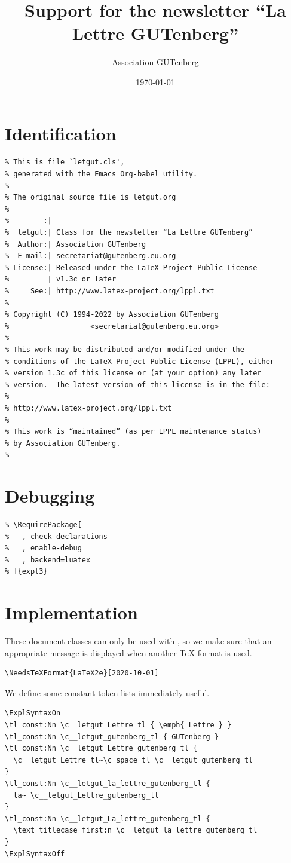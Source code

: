 \documentclass{letgut}
\author{Association GUTenberg}
\date{\today}
\title{Support for the newsletter “La Lettre GUTenberg”}
\begin{document}
\section{Identification}
\label{sec:org4c9ba67}

\begin{lstlisting}
% This is file `letgut.cls',
% generated with the Emacs Org-babel utility.
%
% The original source file is letgut.org
%
% -------:| ----------------------------------------------------
%  letgut:| Class for the newsletter “La Lettre GUTenberg”
%  Author:| Association GUTenberg
%  E-mail:| secretariat@gutenberg.eu.org
% License:| Released under the LaTeX Project Public License
%         | v1.3c or later
%     See:| http://www.latex-project.org/lppl.txt
%
% Copyright (C) 1994-2022 by Association GUTenberg
%                   <secretariat@gutenberg.eu.org>
%
% This work may be distributed and/or modified under the
% conditions of the LaTeX Project Public License (LPPL), either
% version 1.3c of this license or (at your option) any later
% version.  The latest version of this license is in the file:
%
% http://www.latex-project.org/lppl.txt
%
% This work is “maintained” (as per LPPL maintenance status)
% by Association GUTenberg.
%
\end{lstlisting}

\section{Debugging}
\label{sec:org09b0cd2}

\begin{lstlisting}
% \RequirePackage[
%   , check-declarations
%   , enable-debug
%   , backend=luatex
% ]{expl3}
\end{lstlisting}

\section{Implementation}
\label{sec:org59fbe1b}

These document classes can only be used with \LaTeXe, so we make
sure that an appropriate message is displayed when another \TeX{}
format is used.

\begin{lstlisting}
\NeedsTeXFormat{LaTeX2e}[2020-10-01]
\end{lstlisting}

We define some constant token lists immediately useful.

\begin{lstlisting}
\ExplSyntaxOn
\tl_const:Nn \c__letgut_Lettre_tl { \emph{ Lettre } }
\tl_const:Nn \c__letgut_gutenberg_tl { GUTenberg }
\tl_const:Nn \c__letgut_Lettre_gutenberg_tl {
  \c__letgut_Lettre_tl~\c_space_tl \c__letgut_gutenberg_tl
}
\tl_const:Nn \c__letgut_la_lettre_gutenberg_tl {
  la~ \c__letgut_Lettre_gutenberg_tl
}
\tl_const:Nn \c__letgut_La_lettre_gutenberg_tl {
  \text_titlecase_first:n \c__letgut_la_lettre_gutenberg_tl
}
\ExplSyntaxOff
\end{lstlisting}
\end{document}
